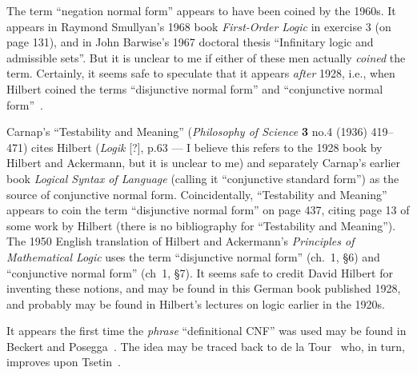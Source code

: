 \begin{node}
\begin{node}[History]\label{prop:normal-form-000N}%
\begin{node}\label{prop-normal-form-0003}%
The term ``negation normal form'' appears to have been coined by the
1960s. It appears in Raymond Smullyan's 1968 book \textit{First-Order Logic}
in exercise 3 (on page 131), and in John Barwise's 1967 doctoral thesis
``Infinitary logic and admissible sets''. But it is unclear to me if
either of these men actually \emph{coined} the term. Certainly, it seems
safe to speculate that it appears \emph{after} 1928, i.e., when Hilbert
coined the terms ``disjunctive normal form'' and ``conjunctive normal form''~.
\end{node}

\begin{node}\label{prop-normal-form-0004}%
Carnap's ``Testability and Meaning'' (\textit{Philosophy of Science}
\textbf{3} no.4 (1936) 419--471) cites Hilbert (\textit{Logik} [?],
p.63 --- I believe this refers to the 1928 book by Hilbert and
Ackermann, but it is unclear to me) and separately Carnap's earlier book \textit{Logical Syntax of Language}
(calling it  ``conjunctive standard form'') as the source of conjunctive
normal form. Coincidentally, ``Testability and Meaning'' appears to coin
the term ``disjunctive normal form'' on page 437, citing page 13 of some work by Hilbert (there is no bibliography for ``Testability and Meaning'').
The 1950 English translation of Hilbert and Ackermann's
\textit{Principles of Mathematical Logic} uses the term ``disjunctive
normal form'' (ch.~1, \S6) and ``conjunctive normal form'' (ch~1, \S7).
It seems safe to credit David Hilbert for inventing these notions, and
may be found in this German book published 1928, and probably may be
found in Hilbert's lectures on logic earlier in the 1920s.
\end{node}

\begin{node}\label{prop-000X}%
It appears the first time the \emph{phrase} ``definitional CNF'' was
used may be found in Beckert and Posegga~\cite{beckert1994lean}. The
idea may be traced back to de la Tour~\cite{de1990minimizing} who, in
turn, improves upon Tsetin~\cite{Tseitin1983}.
\end{node}
\end{node}
\end{node}
